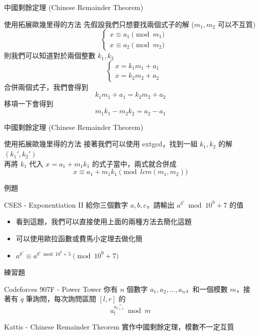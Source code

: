 \documentclass[aspectratio=169]{beamer}
\begin{document}
\begin{frame}{中國剩餘定理 (Chinese Remainder Theorem)}
    \begin{alertblock}{使用拓展歐幾里得的方法}
        先假設我們只想要找兩個式子的解 ($m_1, m_2$ 可以不互質)
        $$\quad \left\{ \begin{matrix} x \equiv a_1 \pmod {m_1} \\ x \equiv a_2 \pmod {m_2} \end{matrix} \right.$$
        則我們可以知道對於兩個整數 $k_1, k_2$
        $$\quad \left\{ \begin{matrix} x = k_1m_1 + a_1 \\ x = k_2m_2 + a_2 \end{matrix} \right.$$
        合併兩個式子，我們會得到
        $$k_1m_1 + a_1 = k_2m_2 + a_2$$
        移項一下會得到
        $$m_1k_1 - m_2k_2 = a_2-a_1$$
    \end{alertblock}
\end{frame}

\begin{frame}{中國剩餘定理 (Chinese Remainder Theorem)}
    \begin{alertblock}{使用拓展歐幾里得的方法}
        接著我們可以使用 extgcd，找到一組 $k_1, k_2$ 的解 $(k_1', k_2')$ \\
        \vspace{5mm}
        再將 $k_1$ 代入 $x = a_1 + m_1k_1$ 的式子當中，兩式就合併成 
        $$x \equiv a_1 + m_1 k_1 \pmod {lcm(m_1,m_2)}$$
    \end{alertblock}
\end{frame}

\begin{frame}{例題}
    \begin{block}{CSES - Exponentiation II}
        給你三個數字 $a,b,c$，請輸出 $a^{b^c} \bmod 10^9+7$ 的值 
    \end{block}
    \begin{itemize}
        \item<1-> 看到這題，我們可以直接使用上面的兩種方法去簡化這題
        \item<1-> 可以使用歐拉函數或費馬小定理去做化簡
        \item<2-> $a^{b^c} \equiv a^{b^c \bmod 10^9+5} \pmod{10^9+7}$
    \end{itemize}
\end{frame}

\begin{frame}{練習題}
    \begin{block}{Codeforces 907F - Power Tower}
        你有 $n$ 個數字 $a_1,a_2,\ldots,a_n$，和一個模數 $m$，接著有 $q$ 筆詢問，每次詢問區間 $[l,r]$ 的
        $$a_l^{a_{l+1}^{\ldots^{a_r}}} \bmod m$$
    \end{block}
    
    \begin{block}{Kattis - Chinese Remainder Theorem}
        實作中國剩餘定理，模數不一定互質
    \end{block}
\end{frame}
\end{document}
